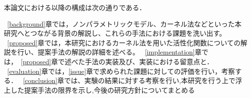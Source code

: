 本論文における以降の構成は次の通りである．

~\ref{background}章では，ノンパラメトリックモデル、カーネル法などといった本研究へとつながる背景の解説し、これらの手法における課題を洗い出す。
~\ref{proposed}章では，本研究におけるカーネル法を用いた活性化関数についての解説を行い、提案手法の解説の詳細を述べる。
~\ref{implementation}章では，~\ref{proposed}章で述べた手法の実装及び、実装における留意点と．
~\ref{evaluation}章では，\ref{issue}章で求められた課題に対しての評価を行い，考察する．
~\ref{conclusion}章では、実験の結果に対する考察を行い,本研究を行う上で浮上した提案手法の限界を示し,今後の研究方針についてまとめる






